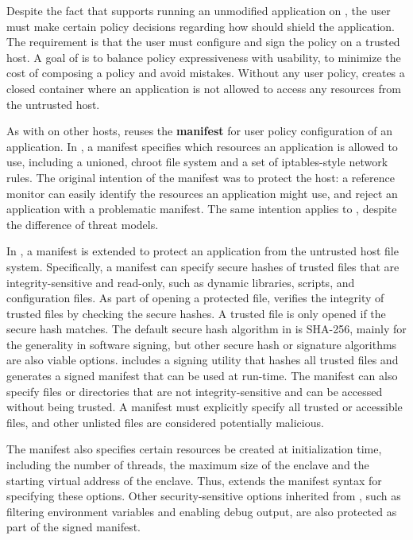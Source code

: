 \label{sec:sgx:overview:config}


Despite the fact that \graphenesgx{} supports running an unmodified application on \sgx{},
the user must make certain policy decisions
regarding how \graphenesgx{} should shield the application.
The requirement is that
the user must configure and sign the policy on a trusted host.
A goal of \graphenesgx{} is to balance policy expressiveness
with usability,
to minimize the cost of composing a policy and avoid mistakes.
Without any user policy, \graphenesgx{} creates a closed container
where an application
is not allowed to access any resources
from the untrusted host.


As with \graphene{} on other hosts,
\graphenesgx{} reuses the {\bf manifest} for user policy configuration of an application.
In \graphene{},
a manifest specifies which resources an application is allowed to use, including
a unioned, chroot file system
and a set of iptables-style network rules.
The original intention of the manifest was to protect the host:
a reference monitor
can easily identify the resources an application might use, and reject an application
with a problematic manifest.
The same intention
applies to \graphenesgx{}, despite the difference of threat models.


In \graphenesgx{}, a manifest is extended to protect an application from the untrusted host file system.
Specifically, a manifest can specify secure hashes of trusted files that are integrity-sensitive and read-only,
such as dynamic libraries, scripts, and configuration files.
As part of opening a protected file,
\graphenesgx{} verifies the integrity of trusted files by checking the secure hashes.
A trusted file is only opened if the secure hash matches.
The default secure hash algorithm
in \graphenesgx{} is SHA-256, mainly for the generality in software signing,
but other secure hash or signature algorithms
are also viable options.
\graphenesgx{} includes a signing utility that hashes all trusted files and generates a signed manifest that can be used at run-time.
The manifest can also specify files or directories that
are not integrity-sensitive
and can be accessed without being trusted.
A manifest must explicitly specify all trusted or accessible files,
and other unlisted files
are considered potentially malicious.



The manifest also specifies certain resources be created at initialization time,
including the number of threads,
the maximum size of the enclave and the starting virtual address of the enclave.
Thus, \graphenesgx{} extends the \graphene{} manifest syntax for  specifying these options.
Other security-sensitive options inherited from \graphene{}, such as filtering environment variables
and enabling debug output, are also protected as part of the signed manifest.



